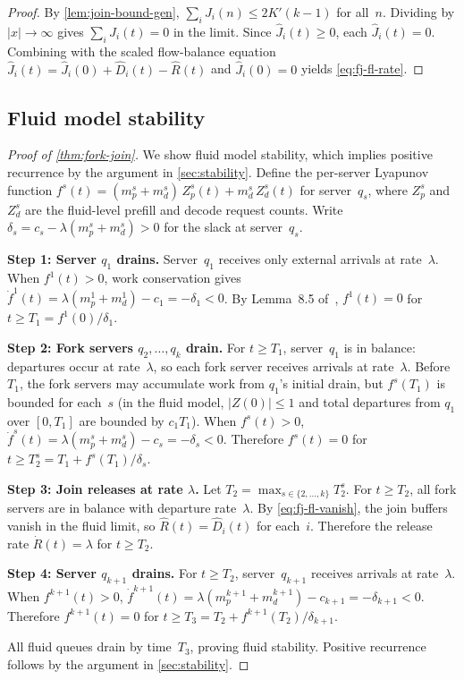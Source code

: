 \documentclass[11pt]{article}
\theoremstyle{plain}
\theoremstyle{definition}
\theoremstyle{remark}
\begin{document}
\begin{proof}
By \cref{lem:join-bound-gen}, $\sum_i J_i(n)\le 2K'(k-1)$ for all~$n$. Dividing by $|x|\to\infty$ gives $\sum_i \hat J_i(t)=0$ in the limit. Since $\hat J_i(t)\ge 0$, each $\hat J_i(t)=0$. Combining with the scaled flow-balance equation $\hat J_i(t) = \hat J_i(0) + \hat D_i(t) - \hat R(t)$ and $\hat J_i(0)=0$ yields \cref{eq:fj-fl-rate}.
\end{proof}

\subsection{Fluid model stability}

\begin{proof}[Proof of \cref{thm:fork-join}]
We show fluid model stability, which implies positive recurrence by the argument in \cref{sec:stability}. Define the per-server Lyapunov function $f^s(t) = (m^s_p+m^s_d)\,Z^s_p(t) + m^s_d\,Z^s_d(t)$ for server~$q_s$, where $Z^s_p$ and $Z^s_d$ are the fluid-level prefill and decode request counts. Write $\delta_s = c_s - \lambda(m^s_p+m^s_d) > 0$ for the slack at server~$q_s$.

\textbf{Step 1: Server $q_1$ drains.}
Server~$q_1$ receives only external arrivals at rate~$\lambda$. When $f^1(t)>0$, work conservation gives $\dot f^1(t) = \lambda(m^1_p+m^1_d) - c_1 = -\delta_1 < 0$. By Lemma~8.5 of~\citep{dai2020processing}, $f^1(t)=0$ for $t\ge T_1 = f^1(0)/\delta_1$.

\textbf{Step 2: Fork servers $q_2,\ldots,q_k$ drain.}
For $t\ge T_1$, server~$q_1$ is in balance: departures occur at rate~$\lambda$, so each fork server receives arrivals at rate~$\lambda$. Before $T_1$, the fork servers may accumulate work from $q_1$'s initial drain, but $f^s(T_1)$ is bounded for each~$s$ (in the fluid model, $|Z(0)|\le 1$ and total departures from $q_1$ over $[0,T_1]$ are bounded by $c_1 T_1$). When $f^s(t)>0$, $\dot f^s(t) = \lambda(m^s_p+m^s_d) - c_s = -\delta_s < 0$. Therefore $f^s(t)=0$ for $t\ge T^s_2 = T_1 + f^s(T_1)/\delta_s$.

\textbf{Step 3: Join releases at rate $\lambda$.}
Let $T_2 = \max_{s\in\{2,\ldots,k\}} T^s_2$. For $t\ge T_2$, all fork servers are in balance with departure rate~$\lambda$. By \cref{eq:fj-fl-vanish}, the join buffers vanish in the fluid limit, so $\hat R(t) = \hat D_i(t)$ for each~$i$. Therefore the release rate $\dot R(t) = \lambda$ for $t\ge T_2$.

\textbf{Step 4: Server $q_{k+1}$ drains.}
For $t\ge T_2$, server~$q_{k+1}$ receives arrivals at rate~$\lambda$. When $f^{k+1}(t)>0$, $\dot f^{k+1}(t) = \lambda(m^{k+1}_p+m^{k+1}_d) - c_{k+1} = -\delta_{k+1} < 0$. Therefore $f^{k+1}(t)=0$ for $t\ge T_3 = T_2 + f^{k+1}(T_2)/\delta_{k+1}$.

All fluid queues drain by time~$T_3$, proving fluid stability. Positive recurrence follows by the argument in \cref{sec:stability}.
\end{proof}
\end{document}

